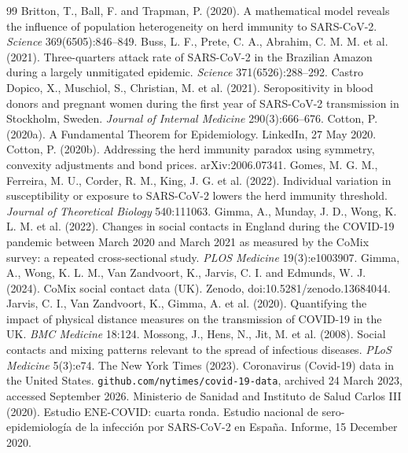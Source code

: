 \documentclass[11pt]{article}
\theoremstyle{remark}
\begin{document}
\begin{thebibliography}{99}
 Britton, T., Ball, F. and Trapman, P. (2020). A mathematical model reveals the influence of population heterogeneity on herd immunity to SARS-CoV-2. \emph{Science} 369(6505):846--849.
 Buss, L. F., Prete, C. A., Abrahim, C. M. M. et al. (2021). Three-quarters attack rate of SARS-CoV-2 in the Brazilian Amazon during a largely unmitigated epidemic. \emph{Science} 371(6526):288--292.
 Castro Dopico, X., Muschiol, S., Christian, M. et al. (2021). Seropositivity in blood donors and pregnant women during the first year of SARS-CoV-2 transmission in Stockholm, Sweden. \emph{Journal of Internal Medicine} 290(3):666--676.
 Cotton, P. (2020a). A Fundamental Theorem for Epidemiology. LinkedIn, 27 May 2020.
 Cotton, P. (2020b). Addressing the herd immunity paradox using symmetry, convexity adjustments and bond prices. arXiv:2006.07341.
 Gomes, M. G. M., Ferreira, M. U., Corder, R. M., King, J. G. et al. (2022). Individual variation in susceptibility or exposure to SARS-CoV-2 lowers the herd immunity threshold. \emph{Journal of Theoretical Biology} 540:111063.
 Gimma, A., Munday, J. D., Wong, K. L. M. et al. (2022). Changes in social contacts in England during the COVID-19 pandemic between March 2020 and March 2021 as measured by the CoMix survey: a repeated cross-sectional study. \emph{PLOS Medicine} 19(3):e1003907.
 Gimma, A., Wong, K. L. M., Van Zandvoort, K., Jarvis, C. I. and Edmunds, W. J. (2024). CoMix social contact data (UK). Zenodo, doi:10.5281/zenodo.13684044.
 Jarvis, C. I., Van Zandvoort, K., Gimma, A. et al. (2020). Quantifying the impact of physical distance measures on the transmission of COVID-19 in the UK. \emph{BMC Medicine} 18:124.
 Mossong, J., Hens, N., Jit, M. et al. (2008). Social contacts and mixing patterns relevant to the spread of infectious diseases. \emph{PLoS Medicine} 5(3):e74.
 The New York Times (2023). Coronavirus (Covid-19) data in the United States. \texttt{github.com/nytimes/covid-19-data}, archived 24 March 2023, accessed September 2026.
 Ministerio de Sanidad and Instituto de Salud Carlos III (2020). Estudio ENE-COVID: cuarta ronda. Estudio nacional de sero-epidemiolog\'ia de la infecci\'on por SARS-CoV-2 en Espa\~na. Informe, 15 December 2020.

\end{thebibliography}
\end{document}
